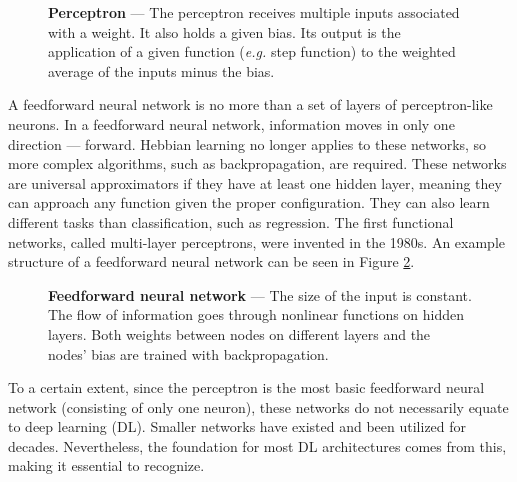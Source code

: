 \begin{figure}[ht]
    \centering
    \caption[Perceptron]{\textbf{Perceptron} --- The perceptron receives multiple inputs associated with a weight. It also holds a given bias. Its output is the application of a given function (\textit{e.g.} step function) to the weighted average of the inputs minus the bias.}
    \label{fig:perceptron}
\end{figure}

A feedforward neural network is no more than a set of layers of perceptron-like neurons. In a feedforward neural network, information moves in only one direction --- forward. Hebbian learning no longer applies to these networks, so more complex algorithms, such as backpropagation, are required. These networks are universal approximators \cite{cybenko_approximation_1989} if they have at least one hidden layer, meaning they can approach any function given the proper configuration. They can also learn different tasks than classification, such as regression. The first functional networks, called multi-layer perceptrons, were invented in the 1980s. An example structure of a feedforward neural network can be seen in Figure \ref{fig:feed_forward_neural_network}.

\begin{figure}[!ht]
    \centering
    \caption[Feedforward Neural Network]{\textbf{Feedforward neural network} --- The size of the input is constant. The flow of information goes through nonlinear functions on hidden layers. Both weights between nodes on different layers and the nodes' bias are trained with backpropagation.}
    \label{fig:feed_forward_neural_network}
\end{figure}

To a certain extent, since the perceptron is the most basic feedforward neural network (consisting of only one neuron), these networks do not necessarily equate to deep learning (\ac{DL}). Smaller networks have existed and been utilized for decades. Nevertheless, the foundation for most \ac{DL} architectures comes from this, making it essential to recognize.